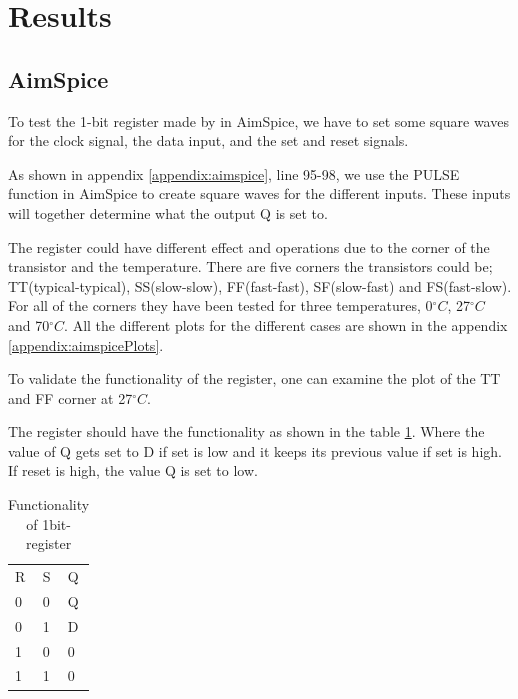 \section{Results}
\label{sec:results}

\subsection{AimSpice}

To test the 1-bit register made by in AimSpice, we have to set some square waves for the clock signal, the data input, and the set and reset signals.

As shown in appendix \ref{appendix:aimspice}, line 95-98, we use the PULSE function in AimSpice to create square waves for the different inputs. These inputs will together determine what the output Q is set to. 

The register could have different effect and operations due to the corner of the transistor and the temperature. There are five corners the transistors could be; TT(typical-typical), SS(slow-slow), FF(fast-fast), SF(slow-fast) and FS(fast-slow). For all of the corners they have been tested for three temperatures, 0$^\circ C$, 27$^\circ C$ and 70$^\circ C$. All the different plots for the different cases are shown in the appendix \ref{appendix:aimspicePlots}. 

To validate the functionality of the register, one can examine the plot of the TT and FF corner at 27$^\circ C$. 

The register should have the functionality as shown in the table \ref{tab:registerFunc}. Where the value of Q gets set to D if set is low and it keeps its previous value if set is high. If reset is high, the value Q is set to low. 

\begin{table}[H]
\label{tab:registerFunc}
\centering
\caption{Functionality of 1bit-register}
\begin{tabular}{|l|l|l|}
\cline{1-3}
R & S & Q  \\ \cline{1-3}
0 & 0 & Q  \\ \cline{1-3}
0 & 1 & D  \\ \cline{1-3}
1 & 0 & 0  \\ \cline{1-3}
1 & 1 & 0  \\ \cline{1-3}
\end{tabular}
\end{table}


